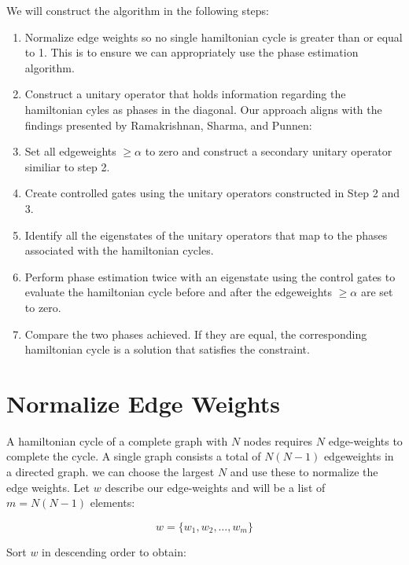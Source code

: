 \documentclass[msc,oneside]{ubcthesis}
\begin{document}
	
	We will construct the algorithm in the following steps:
	\begin{enumerate}
		\item Normalize edge weights so no single hamiltonian cycle is greater than or equal to 1. This is to ensure we can appropriately use the phase estimation algorithm.\\
		\item Construct a unitary operator that holds information regarding the hamiltonian cyles as phases in the diagonal. Our approach aligns with the findings presented by Ramakrishnan, Sharma, and Punnen: \cite{srinivasan2018efficient}\\
		\item Set all edgeweights $\geq \alpha$ to zero and construct a secondary unitary operator similiar to step 2.\\
		\item Create controlled gates using the unitary operators constructed in Step 2 and 3.\\
		\item Identify all the eigenstates of the unitary operators that map to the phases associated with the hamiltonian cycles.\\
		\item Perform phase estimation twice with an eigenstate using the control gates to evaluate the hamiltonian cycle before and after the edgeweights $\geq \alpha$ are set to zero.\\
		\item Compare the two phases achieved. If they are equal, the corresponding hamiltonian cycle is a solution that satisfies the constraint.\\
		
	\end{enumerate}
		
	\section{Normalize Edge Weights}
	
	A hamiltonian cycle of a complete graph with $N$ nodes requires $N$ edge-weights to complete the cycle. A single graph consists a total of $N(N-1)$ edgeweights in a directed graph. we can choose the largest $N$ and use these to normalize the edge weights. Let $w$ describe our edge-weights and will be a list of $m = N(N-1)$ elements:
	
	$$w = \{w_1, w_2, \ldots, w_m\}$$ 
	
	Sort $w$ in descending order to obtain:
	
\end{document}
